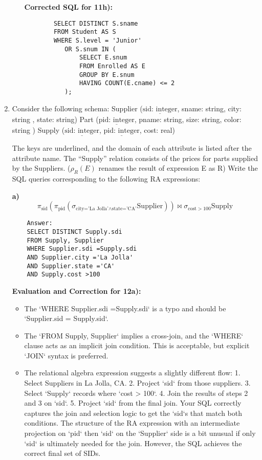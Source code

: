 \documentclass{article}
\begin{document}
\begin{enumerate}[label=\textbf{Question \arabic*.}]
\begin{itemize}
        \textbf{Corrected SQL for 11h):}
        \begin{lstlisting}
        SELECT DISTINCT S.sname
        FROM Student AS S
        WHERE S.level = 'Junior'
           OR S.snum IN (
               SELECT E.snum
               FROM Enrolled AS E
               GROUP BY E.snum
               HAVING COUNT(E.cname) <= 2
           );
        \end{lstlisting}
    \end{itemize}

\item Consider the following schema:
    Supplier ($\underline{\text{sid: integer}}$, sname: string, city: string ,  state: string)
    Part     ($\underline{\text{pid: integer}}$, pname: string, size: string, color: string )
    Supply   ($\underline{\text{sid: integer}}$,  $\underline{\text{pid: integer}}$, cost: real)

    The keys are underlined, and the domain of each attribute is listed after the attribute name. The “Supply” relation consists of the prices for parts supplied by the Suppliers. ($\rho_R(E)$ renames the result of expression E as R)
    Write the SQL queries corresponding to the following RA expressions:

    \textbf{a) $$\pi_{\text{sid}}(\pi_{\text{pid}}(\sigma_{\text{city='La Jolla'} \wedge \text{state='CA'}} \text{Supplier})) \bowtie \sigma_{\text{cost} > 100} \text{Supply}$$}
    \begin{lstlisting}
    Answer:
    SELECT DISTINCT Supply.sdi
    FROM Supply, Supplier
    WHERE Supplier.sdi =Supply.sdi
    AND Supplier.city ='La Jolla'
    AND Supplier.state ='CA'
    AND Supply.cost >100
    \end{lstlisting}
    \textbf{Evaluation and Correction for 12a):}
    \begin{itemize}
        \item The `WHERE Supplier.sdi =Supply.sdi` is a typo and should be `Supplier.sid = Supply.sid`.
        \item The `FROM Supply, Supplier` implies a cross-join, and the `WHERE` clause acts as an implicit join condition. This is acceptable, but explicit `JOIN` syntax is preferred.
        \item The relational algebra expression suggests a slightly different flow:
            1. Select Suppliers in La Jolla, CA.
            2. Project `sid` from those suppliers.
            3. Select `Supply` records where `cost > 100`.
            4. Join the results of steps 2 and 3 on `sid`.
            5. Project `sid` from the final join.
        Your SQL correctly captures the join and selection logic to get the `sid`s that match both conditions. The structure of the RA expression with an intermediate projection on `pid` then `sid` on the `Supplier` side is a bit unusual if only `sid` is ultimately needed for the join. However, the SQL achieves the correct final set of SIDs.


\end{itemize}
\end{enumerate}
\end{document}
